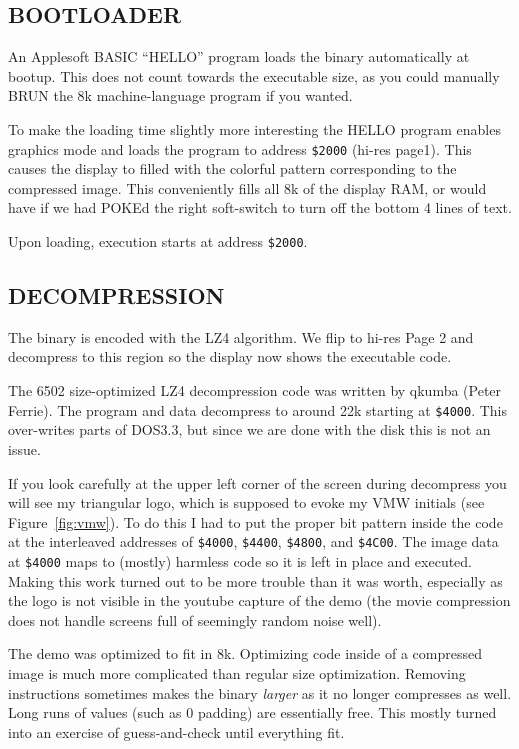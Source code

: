 \documentclass[twocolumn]{article}
\begin{document}
\subsection{BOOTLOADER}

An Applesoft BASIC ``HELLO'' program loads the binary automatically at bootup.
This does not count towards the executable size, as you could manually BRUN 
the 8k machine-language program if you wanted.

To make the loading time slightly more interesting the HELLO program enables
graphics mode and loads the program to address {\tt \$2000} (hi-res page1).
This causes the display to filled with the colorful pattern corresponding
to the compressed image.
This conveniently fills all 8k of the display RAM, or would have
if we had POKEd the right soft-switch to turn off
the bottom 4 lines of text.

Upon loading, execution starts at address {\tt \$2000}.

\subsection{DECOMPRESSION}

The binary is encoded with the LZ4 algorithm.
We flip to hi-res Page 2 and decompress to this region so the display
now shows the executable code.

The 6502 size-optimized LZ4 decompression code was written by qkumba
(Peter Ferrie).
The program and data decompress to around 22k starting at {\tt \$4000}.
This over-writes parts of DOS3.3, but since we are done with the disk
this is not an issue.

If you look carefully at the upper left corner of the screen during
decompress you will see my triangular logo, which is supposed to evoke
my VMW initials (see Figure~\ref{fig:vmw}).
To do this I had to put the proper bit pattern inside the code
at the interleaved addresses of {\tt \$4000}, {\tt \$4400}, {\tt \$4800},
and {\tt \$4C00}.
The image data at {\tt \$4000} maps to (mostly)
harmless code so it is left in place and executed.
Making this work turned out to be more trouble than it was worth, especially
as the logo is not visible in the youtube capture of the demo (the movie
compression does not handle screens full of seemingly random noise well).

The demo was optimized to fit in 8k.
Optimizing code inside of a compressed image is much more complicated than
regular size optimization.
Removing instructions sometimes makes the binary {\em larger} as it no longer
compresses as well.
Long runs of values (such as 0 padding) are essentially free.
This mostly turned into an exercise of guess-and-check until everything fit.
\end{document}
